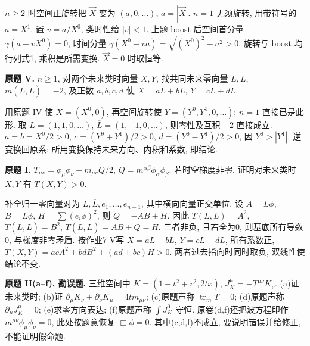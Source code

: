 \begin{solution}
$n\ge2$ 时空间正旋转把 $\vec X$ 变为 $(a,0,\ldots)$, $a=|\vec X|$. $n=1$ 无须旋转, 用带符号的 $a=X^1$. 置 $v=a/X^0$, 类时性给 $|v|<1$. 上题 boost 后空间首分量 $\gamma(a-vX^0)=0$, 时间分量 $\gamma(X^0-va)=\sqrt{(X^0)^2-a^2}>0$. 旋转与 boost 均行列式1, 乘积是所需变换. $\vec X=0$ 时取恒等.
\end{solution}
\begin{exercise}\label{ps:7V}
\textbf{原题 V.} $n\ge1$, 对两个未来类时向量 $X,Y$, 找共同未来零向量 $L,\overline L$, $m(L,\overline L)=-2$, 及正数 $a,b,c,d$ 使 $X=aL+b\overline L$, $Y=cL+d\overline L$.
\end{exercise}
\begin{solution}
用原题 IV 使 $X=(X^0,0)$, 再空间旋转使 $Y=(Y^0,Y^1,0,\ldots)$; $n=1$ 直接已是此形. 取 $L=(1,1,0,\ldots)$, $\overline L=(1,-1,0,\ldots)$, 则零性及互积 $-2$ 直接成立. $a=b=X^0/2>0$, $c=(Y^0+Y^1)/2>0$, $d=(Y^0-Y^1)/2>0$, 因 $Y^0>|Y^1|$. 逆变换回原系; 所用变换保持未来方向、内积和系数, 即结论.
\end{solution}
\begin{exercise}\label{ps:8I}
\textbf{原题 I.} $T_{\mu\nu}=\phi_\mu\phi_\nu-m_{\mu\nu}Q/2$, $Q=m^{\alpha\beta}\phi_\alpha\phi_\beta$. 若时空梯度非零, 证明对未来类时 $X,Y$ 有 $T(X,Y)>0$.
\end{exercise}
\begin{solution}
补全归一零向量对为 $L,\overline L,e_1,\ldots,e_{n-1}$, 其中横向向量正交单位. 设 $A=L\phi$, $B=\overline L\phi$, $H=\sum(e_i\phi)^2$, 则 $Q=-AB+H$. 因此 $T(L,L)=A^2$, $T(\overline L,\overline L)=B^2$, $T(L,\overline L)=AB+Q=H$. 三者非负, 且若全为0, 则基底所有导数0, 与梯度非零矛盾. 按作业7-V写 $X=aL+b\overline L$, $Y=cL+d\overline L$, 所有系数正,
$T(X,Y)=acA^2+bdB^2+(ad+bc)H>0$. 两者过去指向时同时取负, 双线性使结论不变.
\end{solution}
\begin{exercise}\label{ps:8II}
\textbf{原题 II(a--f), 勘误题.} 三维空间中 $K=(1+t^2+r^2,2tx)$, $J_K^\mu=-T^{\mu\nu}K_\nu$. (a)证未来类时; (b)证 $\partial_\mu K_\nu+\partial_\nu K_\mu=4tm_{\mu\nu}$; (c)原题声称 $\operatorname{tr}_mT=0$; (d)原题声称 $\partial_\mu J_K^\mu=0$; (e)求零方向表达; (f)原题声称 $\int J_K^0$ 守恒. 原卷(d,f)还把波方程印作 $m^{\mu\nu}\phi_\mu\phi_\nu=0$, 此处按题意恢复 $\Box\phi=0$. 其中(c,d,f)不成立, 要说明错误并给修正, 不能证明假命题.
\end{exercise}
